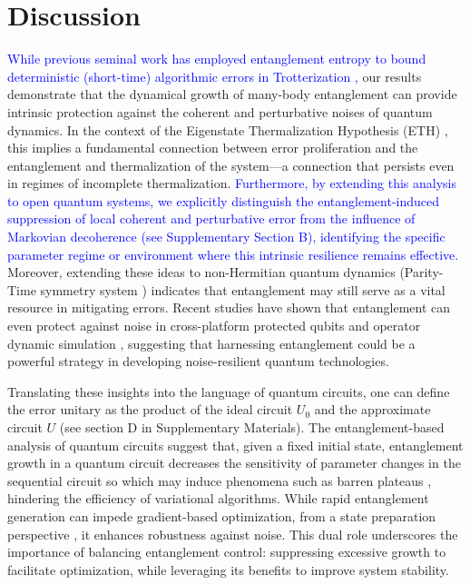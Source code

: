 \documentclass[12pt]{article}
\begin{document}
\section*{Discussion}
\textcolor{blue}{While previous seminal work has employed entanglement entropy to bound deterministic (short-time) algorithmic errors in Trotterization \cite{Zhao_2025NP},}
our results demonstrate that the dynamical growth of many-body entanglement can provide intrinsic protection against the coherent and perturbative noises of quantum dynamics. In the context of the Eigenstate Thermalization Hypothesis (ETH) \cite{ETHPhysRevA.43.2046,ETHPhysRevE.50.888}, this implies a fundamental connection between error proliferation and the entanglement and thermalization of the system---a connection that persists even in regimes of incomplete thermalization. \textcolor{blue}{Furthermore, by extending this analysis to open quantum systems, we explicitly distinguish the entanglement-induced suppression of local coherent and perturbative error from the influence of Markovian decoherence (see Supplementary Section B), identifying the specific parameter regime or environment where this intrinsic resilience remains effective.} Moreover, extending these ideas to non-Hermitian quantum dynamics (Parity-Time symmetry system \cite{PTPhysRevLett.80.5243, PT2PhysRevLett.98.040403}) indicates that entanglement may still serve as a vital resource in mitigating errors. Recent studies have shown that entanglement can even protect against noise in cross-platform protected qubits \cite{qjhp-8x6zlogicalqubitE} and operator dynamic simulation \cite{feng2025trotterizationoperatorscramblingentanglement}, suggesting that harnessing entanglement could be a powerful strategy in developing noise-resilient quantum technologies.

Translating these insights into the language of quantum circuits, 
one can define the error unitary as the product of the ideal circuit $U_0$ and the approximate circuit $U$ (see section D in Supplementary Materials). 
The entanglement-based analysis of quantum circuits suggest that, given a fixed initial state, entanglement growth in a quantum circuit decreases the sensitivity of parameter changes in the sequential circuit so which may induce phenomena such as barren plateaus \cite{ortiz2021entanglement,PhysRevResearch.3.033090}, hindering the efficiency of variational algorithms. While rapid entanglement generation can impede gradient-based optimization, from a state preparation perspective \cite{gleinig2021efficient,Zhang_2022}, it enhances robustness against noise. This dual role underscores the importance of balancing entanglement control: suppressing excessive growth to facilitate optimization, while leveraging its benefits to improve system stability.
\end{document}
